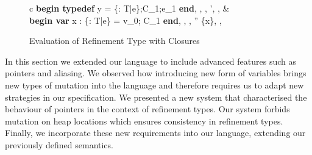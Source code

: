 \documentclass[a4paper,12pt]{report}
\begin{document}
\begin{figure}[H]
  \begin{center}
    \begin{tabular} {c}
      {\langle\textbf{begin typedef } y = \{\upsilon : T\text{ }|\text{ }e\};C_1;e_1\textbf{ end}, 
      \sigma, \tau,  \rangle \longrightarrow \langle \sigma', \tau,  \rangle} 
      & \\
      {\langle\textbf{begin var }x : \{\upsilon : T\text{ }|\text{ }e\} = v_0; C_1 \textbf{ end}, \sigma, \tau,  \rangle 
      \longrightarrow \langle \sigma'' \setminus \{x\}, \tau,  \rangle}
    \end{tabular}
  \end{center}
  \caption{Evaluation of Refinement Type with Closures}
\end{figure}

\par
In this section we extended our language to include advanced features such 
as pointers and aliasing. We observed how introducing new form of 
variables brings new types of mutation into the language and therefore 
requires us to adapt new strategies in our specification. We presented  
a new system that characterised the behaviour of pointers in the context of 
refinement types. Our system forbids mutation on heap locations which ensures 
consistency in refinement types. Finally, we incorporate these new requirements 
into our language, extending our previously defined semantics. 
\end{document}
